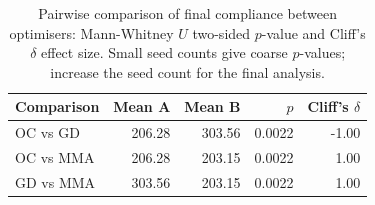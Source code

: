 \begin{table}[htbp]
\centering
\caption{Pairwise comparison of final compliance between optimisers: Mann-Whitney $U$ two-sided $p$-value and Cliff's $\delta$ effect size. Small seed counts give coarse $p$-values; increase the seed count for the final analysis.}
\label{tab:stats}
\begin{tabular}{lrrrr}
\toprule
Comparison & Mean A & Mean B & $p$ & Cliff's $\delta$ \\
\midrule
OC vs GD & 206.28 & 303.56 & 0.0022 & -1.00 \\
OC vs MMA & 206.28 & 203.15 & 0.0022 & 1.00 \\
GD vs MMA & 303.56 & 203.15 & 0.0022 & 1.00 \\
\bottomrule
\end{tabular}
\end{table}
